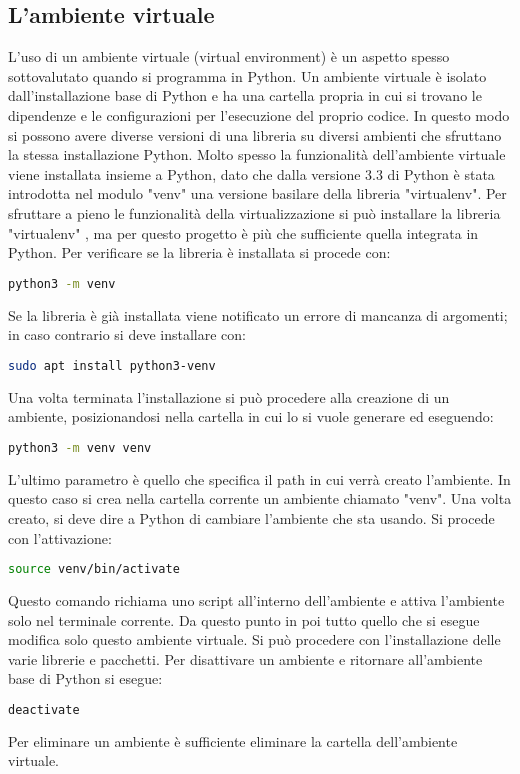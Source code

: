 \subsection{L'ambiente virtuale}
\label{subsec:client-installazione-ambiente-virtuale}
L'uso di un ambiente virtuale (virtual environment) è un aspetto spesso sottovalutato quando si programma in Python.
Un ambiente virtuale è isolato dall'installazione base di Python 
e ha una cartella propria in cui si trovano le dipendenze e le configurazioni per l'esecuzione del proprio codice.
In questo modo si possono avere diverse versioni di una libreria su diversi ambienti che sfruttano la stessa installazione Python.
Molto spesso la funzionalità dell'ambiente virtuale viene installata insieme a Python,
dato che dalla versione 3.3 di Python è stata introdotta nel modulo "venv" una versione basilare della libreria "virtualenv".
Per sfruttare a pieno le funzionalità della virtualizzazione si può installare la libreria "virtualenv" \cite{client-virtualenv},
ma per questo progetto è più che sufficiente quella integrata in Python.
Per verificare se la libreria è installata si procede con:
\begin{lstlisting}[language=bash]
	python3 -m venv
\end{lstlisting}
Se la libreria è già installata viene notificato un errore di mancanza di argomenti; in caso contrario si deve installare con:
\begin{lstlisting}[language=bash]
	sudo apt install python3-venv
\end{lstlisting}
Una volta terminata l'installazione si può procedere alla creazione di un ambiente, 
posizionandosi nella cartella in cui lo si vuole generare ed eseguendo: 
\begin{lstlisting}[language=bash]
	python3 -m venv venv
\end{lstlisting}
L'ultimo parametro è quello che specifica il path in cui verrà creato l'ambiente.
In questo caso si crea nella cartella corrente un ambiente chiamato "venv".
Una volta creato, si deve dire a Python di cambiare l'ambiente che sta usando.
Si procede con l'attivazione:
\begin{lstlisting}[language=bash]
	source venv/bin/activate
\end{lstlisting}
Questo comando richiama uno script all'interno dell'ambiente e attiva l'ambiente solo nel terminale corrente.
Da questo punto in poi tutto quello che si esegue modifica solo questo ambiente virtuale.
Si può procedere con l'installazione delle varie librerie e pacchetti.\newline
Per disattivare un ambiente e ritornare all'ambiente base di Python si esegue:
\begin{lstlisting}[language=bash]
	deactivate
\end{lstlisting}
Per eliminare un ambiente è sufficiente eliminare la cartella dell'ambiente virtuale.


